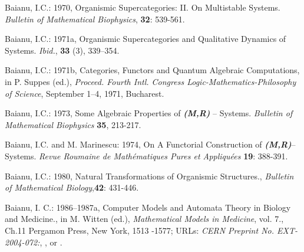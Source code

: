 \documentclass[12pt]{article}
\theoremstyle{plain}
\theoremstyle{definition}
\numberwithin{equation}{section}
\newcommand{\<}{{\langle}}
\begin{document}
\begin{thebibliography}{99}
Baianu, I.C.: 1970, Organismic Supercategories: II. On Multistable Systems. \emph{Bulletin of Mathematical Biophysics}, \textbf{32}: 539-561.

Baianu, I.C.: 1971a, Organismic Supercategories and Qualitative Dynamics of Systems. \emph{Ibid.}, \textbf{33} (3), 339--354.
 
Baianu, I.C.: 1971b, Categories, Functors and Quantum Algebraic Computations, in P. Suppes (ed.), \emph{Proceed. Fourth Intl. Congress Logic-Mathematics-Philosophy of Science}, September 1--4, 1971, Bucharest.

Baianu, I.C.: 1973, Some Algebraic Properties of \emph{\textbf{(M,R)}} -- Systems. \emph{Bulletin of Mathematical Biophysics} \textbf{35}, 213-217.

Baianu, I.C. and M. Marinescu: 1974, On A Functorial Construction of \emph{\textbf{(M,R)}}-- Systems. \emph{Revue Roumaine de Math\'ematiques Pures et Appliqu\'ees} \textbf{19}: 388-391.

Baianu, I.C.: 1980, Natural Transformations of Organismic Structures.,
\emph{Bulletin of Mathematical Biology},\textbf{42}: 431-446.

Baianu, I. C.: 1986--1987a, Computer Models and Automata Theory in Biology and Medicine.,  in M. Witten (ed.), \emph{Mathematical Models in Medicine}, vol. 7., Ch.11 Pergamon Press, New York, 1513 -1577; 
URLs: \emph{CERN Preprint No. EXT-2004-072:},
, or
.




\end{thebibliography}
\end{document}
